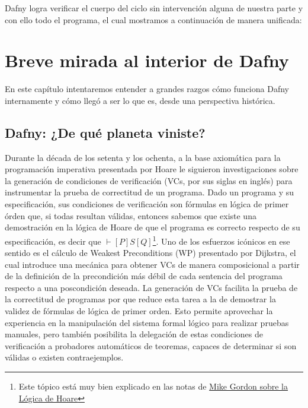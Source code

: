 \documentclass[12pt, a4paper, openany, fleqn]{book}
\begin{document}
    Dafny logra verificar el cuerpo del ciclo sin intervención alguna de nuestra parte y con ello todo el programa, el cual mostramos a continuación de manera unificada:

    \begin{greenbox}
    \end{greenbox}
    \chapter{Breve mirada al interior de Dafny} \label{ch:pipeline-dafny}

    En este capítulo intentaremos entender a grandes razgos cómo funciona Dafny internamente y cómo llegó a ser lo que es, desde una perspectiva histórica.

    \section{Dafny: ¿De qué planeta viniste?}
    Durante la década de los setenta y los ochenta, a la base axiomática para la programación imperativa presentada por Hoare\cite{10.1145/363235.363259} le siguieron investigaciones sobre la generación de condiciones de verificación (VCs, por sus siglas en inglés) para instrumentar la prueba de correctitud de un programa. Dado un programa y su especificación, sus condiciones de verificación son fórmulas en lógica de primer órden que, si todas resultan válidas, entonces sabemos que existe una demostración en la lógica de Hoare de que el programa es correcto respecto de su especificación, es decir que $\vdash[P]S[Q]$\footnote{Este tópico está muy bien explicado en las notas de \href{https://www.cl.cam.ac.uk/archive/mjcg/HL/Notes/Notes.pdf}{Mike Gordon sobre la Lógica de Hoare}}. Uno de los esfuerzos icónicos en ese sentido es el cálculo de Weakest Preconditions (WP) presentado por Dijkstra\cite{EWD:EWD418}, el cual introduce una mecánica para obtener VCs de manera composicional a partir de la definición de la precondición más débil de cada sentencia del programa respecto a una poscondición deseada.
    La generación de VCs facilita la prueba de la correctitud de programas por que reduce esta tarea a la de demostrar la validez de fórmulas de lógica de primer orden. Esto permite aprovechar la experiencia en la manipulación del sistema formal lógico para realizar pruebas manuales, pero también posibilita la delegación de estas condiciones de verificación a probadores automáticos de teoremas, capaces de determinar si son válidas o existen contraejemplos.
\end{document}
